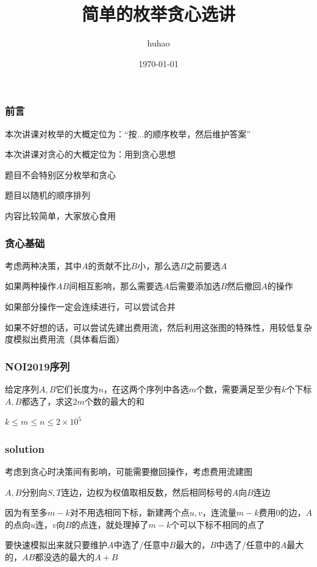 \documentclass[10pt]{beamer}
\begin{document}
	\title{简单的枚举贪心选讲}
	\date{\today}
	\author{huhao}
	\maketitle
	\clearpage
	\begin{frame}
		\frametitle{前言}
		\par 本次讲课对枚举的大概定位为：“按...的顺序枚举，然后维护答案”
		\par 本次讲课对贪心的大概定位为：用到贪心思想
		\par 题目不会特别区分枚举和贪心
		\par 题目以随机的顺序排列
		\par 内容比较简单，大家放心食用
	\end{frame}
	\clearpage
	\begin{frame}
		\frametitle{贪心基础}
		\par 考虑两种决策，其中$A$的贡献不比$B$小，那么选$B$之前要选$A$
		\par 如果两种操作$AB$间相互影响，那么需要选$A$后需要添加选$B$然后撤回$A$的操作
		\par 如果部分操作一定会连续进行，可以尝试合并
		\par 如果不好想的话，可以尝试先建出费用流，然后利用这张图的特殊性，用较低复杂度模拟出费用流（具体看后面）
	\end{frame}
	\clearpage
	\begin{frame}
		\frametitle{NOI2019序列}
		\par 给定序列$A,B$它们长度为$n$，在这两个序列中各选$m$个数，需要满足至少有$k$个下标$A,B$都选了，求这$2m$个数的最大的和
		\par $k\le m\le n\le 2\times 10^5$
	\end{frame}
	\clearpage
	\begin{frame}
		\frametitle{solution}
		 考虑到贪心时决策间有影响，可能需要撤回操作，考虑费用流建图

		 $A,B$分别向$S,T$连边，边权为权值取相反数，然后相同标号的$A$向$B$连边

		 因为有至多$m-k$对不用选相同下标，新建两个点$u,v$，连流量$m-k$费用$0$的边，$A$的点向$u$连，$v$向$B$的点连，就处理掉了$m-k$个可以下标不相同的点了

		 要快速模拟出来就只要维护$A$中选了/任意中$B$最大的，$B$中选了/任意中的$A$最大的，$AB$都没选的最大的$A+B$
	\end{frame}
	\clearpage
\end{document}
